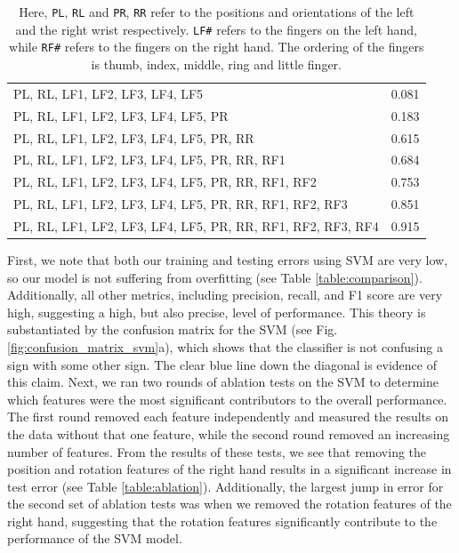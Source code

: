 \documentclass[twocolumn]{article}
\begin{document}
\begin{table}[h]
{\begin{tabular}{|l|c|}
        PL, RL, LF1, LF2, LF3, LF4, LF5 & 0.081 \\ \arrayrulecolor{gray}\hline\arrayrulecolor{black}
        PL, RL, LF1, LF2, LF3, LF4, LF5, PR & 0.183 \\ \arrayrulecolor{gray}\hline\arrayrulecolor{black}
        PL, RL, LF1, LF2, LF3, LF4, LF5, PR, RR & 0.615 \\ \arrayrulecolor{gray}\hline\arrayrulecolor{black}
        PL, RL, LF1, LF2, LF3, LF4, LF5, PR, RR, RF1 & 0.684 \\ \arrayrulecolor{gray}\hline\arrayrulecolor{black}
        PL, RL, LF1, LF2, LF3, LF4, LF5, PR, RR, RF1, RF2 & 0.753 \\ \arrayrulecolor{gray}\hline\arrayrulecolor{black}
        PL, RL, LF1, LF2, LF3, LF4, LF5, PR, RR, RF1, RF2, RF3 & 0.851 \\ \arrayrulecolor{gray}\hline\arrayrulecolor{black}
        PL, RL, LF1, LF2, LF3, LF4, LF5, PR, RR, RF1, RF2, RF3, RF4 & 0.915 \\  \hline
        \end{tabular}
    }
    \caption*{\small{Here, \texttt{PL}, \texttt{RL} and \texttt{PR}, \texttt{RR} refer to the positions and orientations of the left and the right wrist respectively. \texttt{LF\#} refers to the fingers on the left hand, while \texttt{RF\#} refers to the fingers on the right hand. The ordering of the fingers is thumb, index, middle, ring and little finger.}}
    
\end{table}

First, we note that both our training and testing errors using SVM are very low, so our model is not suffering from overfitting (see Table \ref{table:comparison}). Additionally, all other metrics, including precision, recall, and F1 score are very high, suggesting a high, but also precise, level of performance. This theory is substantiated by the confusion matrix for the SVM (see Fig. \ref{fig:confusion_matrix_svm}a), which shows that the classifier is not confusing a sign with some other sign. The clear blue line down the diagonal is evidence of this claim. Next, we ran two rounds of ablation tests on the SVM to determine which features were the most significant contributors to the overall performance. The first round removed each feature independently and measured the results on the data without that one feature, while the second round removed an increasing number of features. From the results of these tests, we see that removing the position and rotation features of the right hand results in a significant increase in test error (see Table \ref{table:ablation}). Additionally, the largest jump in error for the second set of ablation tests was when we removed the rotation features of the right hand, suggesting that the rotation features significantly contribute to the performance of the SVM model.
\end{document}
